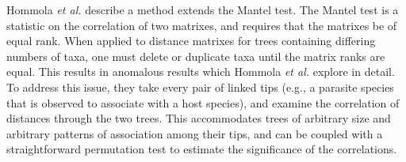 Hommola {\em et al.} \cite{hommola2009permutation} describe a method extends the Mantel test. \cite{mantel1967detection} The Mantel test is a statistic on the correlation of two matrixes, and requires that the matrixes be of equal rank. When applied to distance matrixes for trees containing differing numbers of taxa, one must delete or duplicate taxa until the matrix ranks are equal. This results in anomalous results which Hommola {\em et al.} explore in detail. To address this issue, they take every pair of linked tips (e.g., a parasite species that is observed to associate with a host species), and examine the correlation of distances through the two trees. This accommodates trees of arbitrary size and arbitrary patterns of association among their tips, and can be coupled with a straightforward permutation test to estimate the significance of the correlations.

